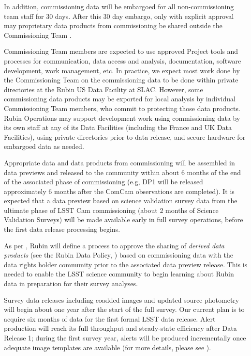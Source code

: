 In addition, commissioning data will be embargoed for all non-commissioning team staff for 30 days. 
After this 30 day embargo, only with explicit approval may proprietary data products from commissioning be shared outside the Commissioning Team   . 

Commissioning Team members are expected to use approved Project tools and processes for communication, data access and analysis, documentation, software development, work management, etc.
In practice, we expect most work done by the Commissioning Team on the commissioning data to be done within private directories at the Rubin US Data Facility at SLAC. 
However, some commissioning data products may be exported for local analysis by individual Commissioning Team members, who commit to protecting those data products. 
Rubin Operations may support development work using commissioning data by its own staff at any of its Data Facilities (including the France and UK Data Facilities), using private directories prior to data release, and secure hardware for embargoed data as needed.

Appropriate data and data products from commissioning will be assembled in data previews  and released to the community within about 6 months of the end of the associated phase of commissioning (e.g, DP1 will be released approximately 6 months after the ComCam observations are completed).
It is expected that a data preview based on science validation survey data from the ultimate phase of LSST Cam commissioning (about 2 months of Science Validation Surveys) will be made available early in full survey operations, before the first data release processing begins.

As per , Rubin will define a process to approve the sharing of {\it derived data products} (see the Rubin Data Policy, ) based on commissioning data with the data rights holder community prior to the associated data preview release.
This is needed to enable the LSST science community to begin learning about Rubin data in preparation for their survey analyses. 

Survey data releases including coadded images and updated source photometry will begin about one year after the start of the full survey. 
Our current plan is to acquire six months of data for the first formal LSST data release.
Alert production will reach its full throughput and steady-state efficiency after Data Release 1; during the first survey year, alerts will be produced incrementally once adequate image templates are available (for more details, please see ). 
